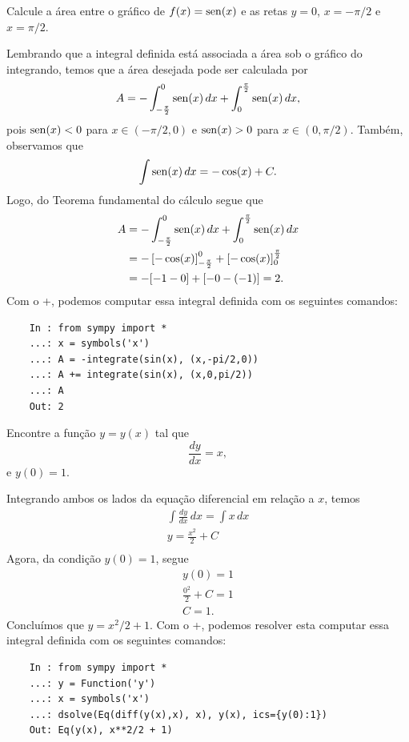 \begin{exeresol}
  Calcule a área entre o gráfico de $f(x) = \operatorname{sen}(x)$ e as retas $y=0$, $x=-\pi/2$ e $x=\pi/2$.
\end{exeresol}
\begin{resol}
  Lembrando que a integral definida está associada a área sob o gráfico do integrando, temos que a área desejada pode ser calculada por
  \begin{equation}
    A = - \int_{-\frac{\pi}{2}}^0 \operatorname{sen}(x)\,dx + \int_0^{\frac{\pi}{2}} \operatorname{sen}(x)\,dx,
  \end{equation}
  pois $\operatorname{sen}(x) < 0$ para $x\in (-\pi/2, 0)$ e $\operatorname{sen}(x) > 0$ para $x\in (0, \pi/2)$.
  Também, observamos que
  \begin{equation}
    \int \operatorname{sen}(x)\,dx = -\cos(x) + C.
  \end{equation}
  Logo, do Teorema fundamental do cálculo segue que
  \begin{align}
    A &= - \int_{-\frac{\pi}{2}}^0 \operatorname{sen}(x)\,dx + \int_0^{\frac{\pi}{2}} \operatorname{sen}(x)\,dx \\
      &= -\left[-\cos(x)\right]_{-\frac{\pi}{2}}^0 + \left[-\cos(x)\right]_0^{\frac{\pi}{2}} \\
      &= -[-1 - 0] + [-0 - (-1)] = 2. 
  \end{align}
  \ifispython
  Com o {\python}+{\sympy}, podemos computar essa integral definida com os seguintes comandos:
  \begin{lstlisting}
    In : from sympy import *
    ...: x = symbols('x')
    ...: A = -integrate(sin(x), (x,-pi/2,0))
    ...: A += integrate(sin(x), (x,0,pi/2))
    ...: A
    Out: 2
  \end{lstlisting}
  \fi  
\end{resol}

\begin{exeresol}
  Encontre a função $y = y(x)$ tal que
  \begin{equation}
    \frac{dy}{dx} = x,
  \end{equation}
  e $y(0) = 1$.
\end{exeresol}
\begin{resol}
  Integrando ambos os lados da equação diferencial em relação a $x$, temos
  \begin{gather}
    \int \frac{dy}{dx}\,dx = \int x\,dx \\
    y = \frac{x^2}{2} + C \\
  \end{gather}
  Agora, da condição $y(0) = 1$, segue
  \begin{gather}
    y(0) = 1 \\
    \frac{0^2}{2} + C = 1 \\
    C = 1.
  \end{gather}
  Concluímos que $y = x^2/2 + 1$.
  \ifispython
  Com o {\python}+{\sympy}, podemos resolver esta computar essa integral definida com os seguintes comandos:
  \begin{lstlisting}
    In : from sympy import *
    ...: y = Function('y')
    ...: x = symbols('x')
    ...: dsolve(Eq(diff(y(x),x), x), y(x), ics={y(0):1})
    Out: Eq(y(x), x**2/2 + 1)
  \end{lstlisting}
  \fi  
\end{resol}

